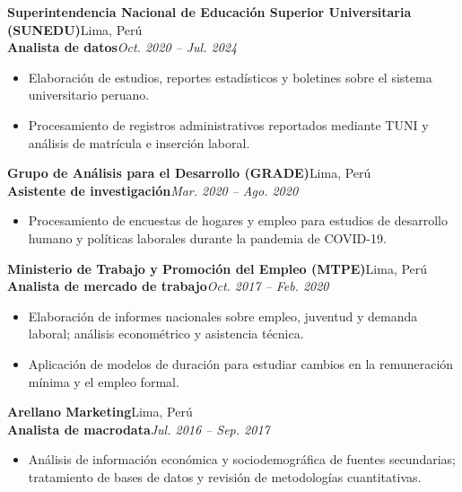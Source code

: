 \documentclass[11pt,a4paper]{article}
\newcommand{\cargo}[4]{%
  \textbf{#1}\hfill #2\\
  \textbf{#3}\hfill \textit{#4}\par\vspace{2pt}
}
\newenvironment{funciones}{%
  \begin{itemize}[
    leftmargin=1.1em,
    itemsep=1pt,
    topsep=2pt,
    parsep=0pt
  ]
}{\end{itemize}\vspace{3pt}}
\begin{document}

\cargo
  {Superintendencia Nacional de Educación Superior Universitaria (SUNEDU)}
  {Lima, Perú}
  {Analista de datos}
  {Oct. 2020 -- Jul. 2024}

\begin{funciones}

  \item Elaboración de estudios, reportes estadísticos y boletines sobre el sistema universitario peruano.

  \item Procesamiento de registros administrativos reportados mediante TUNI y análisis de matrícula e inserción laboral.

\end{funciones}


\cargo
  {Grupo de Análisis para el Desarrollo (GRADE)}
  {Lima, Perú}
  {Asistente de investigación}
  {Mar. 2020 -- Ago. 2020}

\begin{funciones}

  \item Procesamiento de encuestas de hogares y empleo para estudios de desarrollo humano y políticas laborales durante la pandemia de COVID-19.

\end{funciones}


\cargo
  {Ministerio de Trabajo y Promoción del Empleo (MTPE)}
  {Lima, Perú}
  {Analista de mercado de trabajo}
  {Oct. 2017 -- Feb. 2020}

\begin{funciones}

  \item Elaboración de informes nacionales sobre empleo, juventud y demanda laboral; análisis econométrico y asistencia técnica.

  \item Aplicación de modelos de duración para estudiar cambios en la remuneración mínima y el empleo formal.

\end{funciones}


\cargo
  {Arellano Marketing}
  {Lima, Perú}
  {Analista de macrodata}
  {Jul. 2016 -- Sep. 2017}

\begin{funciones}

  \item Análisis de información económica y sociodemográfica de fuentes secundarias; tratamiento de bases de datos y revisión de metodologías cuantitativas.

\end{funciones}
\end{document}
